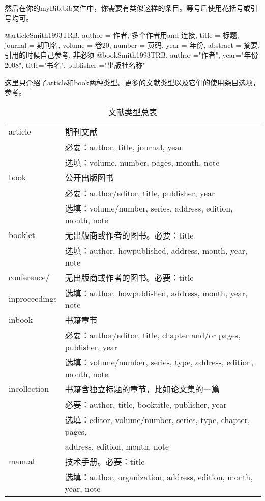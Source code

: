 然后在你的myBib.bib文件中，你需要有类似这样的条目。等号后使用花括号或引号均可。
\begin{latex}{}
@article{Smith1993TRB,
author = {作者, 多个作者用and 连接},
title = {标题},
journal = {期刊名},
volume = {卷20},
number = {页码},
year = {年份},
abstract = {摘要, 引用的时候自己参考, 非必须}}
@book{Smith1993TRB,
author ="作者",
year="年份2008",
title="书名",
publisher ="出版社名称"}
\end{latex}

这里只介绍了article和book两种类型。更多的文献类型以及它们的使用条目选项，参考。

\begin{table}[!htb]
\centering
\caption{\bibtex 文献类型总表}
\label{tab:bibtype}
\begin{tabular}{>{\ttfamily}ll}
\hline
article & 期刊文献 \\
& 必要：author, title, journal, year \\
& 选填：volume, number, pages, month, note \\
\hline
book & 公开出版图书 \\
& 必要：author/editor, title, publisher, year \\
& 选填：volume/number, series, address, edition, month, note \\
\hline
booklet & 无出版商或作者的图书。必要：title\\
& 选填：author, howpublished, address, month, year, note \\
\hline
conference/ & 无出版商或作者的图书。必要：title \\
inproceedings & 选填：author, howpublished, address, month, year, note \\
\hline
inbook & 书籍章节 \\
& 必要：author/editor, title, chapter and/or pages, publisher, year\\
& 选填：volume/number, series, type, address, edition, month, note\\
\hline
incollection & 书籍含独立标题的章节，比如论文集的一篇 \\
& 必要：author, title, booktitle, publisher, year \\
& 选填：editor, volume/number, series, type, chapter, pages, \\
& address, edition, month, note \\
\hline
manual & 技术手册。必要：title \\
& 选填：author, organization, address, edition, month, year, note \\

\end{tabular}
\end{table}
